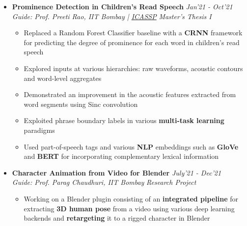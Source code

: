 \documentclass[10pt,letterpaper,sans]{moderncv}
\providecommand{\sl}{\slshape}
\begin{document}
\begin{itemize}
\begin{itemize}
\item Implemented a multi-task learning framework for exploiting hand-crafted features during training
\item Proposed a self-supervised learning framework for utilising an unlabelled dataset
\end{itemize}
\vspace{5pt}
\item \textbf{Prominence Detection in Children's Read Speech} \hfill{\sl  Jan'21 - Oct'21}\\
\textit{Guide: Prof. Preeti Rao, IIT Bombay | \href{https://doi.org/10.1109/ICASSP43922.2022.9747780}{ICASSP}} \hfill {\sl Master's Thesis I}\\
\vspace{-10pt}
\begin{itemize}
\item Replaced a Random Forest Classifier baseline with a \textbf{CRNN} framework for predicting the degree of prominence for each word in children’s read speech
\item Explored inputs at various hierarchies: raw waveforms, acoustic contours and word-level aggregates
\item Demonstrated an improvement in the acoustic features extracted from word segments using Sinc convolution
\item Exploited phrase boundary labels in various \textbf{multi-task learning} paradigms
\item Used part-of-speech tags and various \textbf{NLP} embeddings such as \textbf{GloVe} and \textbf{BERT} for incorporating complementary lexical information
\end{itemize}
\vspace{5pt}
\item \textbf{Character Animation from Video for Blender} \hfill{\sl  July'21 - Dec'21}\\
\textit{Guide: Prof. Parag Chaudhuri, IIT Bombay} \hfill{\sl Research Project}\\
\vspace{-10pt}
\begin{itemize}
\item Working on a Blender plugin consisting of an \textbf{integrated pipeline} for extracting \textbf{3D human pose} from a video using various deep learning backends and \textbf{retargeting} it to a rigged character in Blender

\end{itemize}
\end{itemize}
\end{document}
